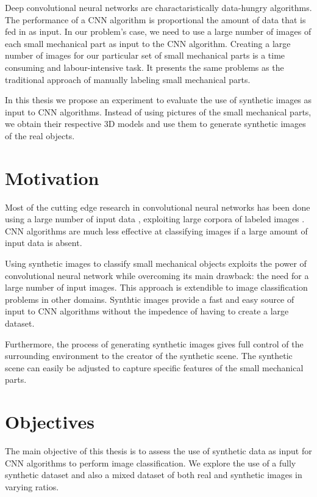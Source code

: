 Deep convolutional neural networks are charactaristically data-hungry algorithms. The performance of a CNN algorithm is proportional the amount of data that is fed in as input. In our problem's case, we need to use a large number of images of each small mechanical part as input to the CNN algorithm. Creating a large number of images for our particular set of small mechanical parts is a time consuming and labour-intensive task. It presents the same problems as the traditional approach of manually labeling small mechanical parts.

In this thesis we propose an experiment to evaluate the use of synthetic images as input to CNN algorithms. Instead of using pictures of the small mechanical parts, we obtain their respective 3D models and use them to generate synthetic images of the real objects.

\section{Motivation}

Most of the cutting edge research in convolutional neural networks has been done using a large number of input data \cite{krizhevsky2012imagenet} \cite{simonyan2014very} \cite{szegedy2015going} \cite{he2016deep}, exploiting large corpora of labeled images \cite{deng2009imagenet}. CNN algorithms are much less effective at classifying images if a large amount of input data is absent.

Using synthetic images to classify small mechanical objects exploits the power of convolutional neural network while overcoming its main drawback: the need for a large number of input images. This approach is extendible to image classification problems in other domains. Synthtic images provide a fast and easy source of input to CNN algorithms without the impedence of having to create a large dataset.

Furthermore, the process of generating synthetic images gives full control of the surrounding environment to the creator of the synthetic scene. The synthetic scene can easily be adjusted to capture specific features of the small mechanical parts.

\section{Objectives}

The main objective of this thesis is to assess the use of synthetic data as input for CNN algorithms to perform image classification. We explore the use of a fully synthetic dataset and also a mixed dataset of both real and synthetic images in varying ratios.

